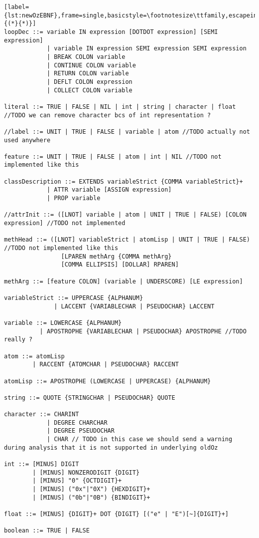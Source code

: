\begin{lstlisting}[label={lst:newOzEBNF},frame=single,basicstyle=\footnotesize\ttfamily,escapeinside={(*}{*)}]
loopDec ::= variable IN expression [DOTDOT expression] [SEMI expression]
            | variable IN expression SEMI expression SEMI expression
            | BREAK COLON variable
            | CONTINUE COLON variable
            | RETURN COLON variable
            | DEFLT COLON expression
            | COLLECT COLON variable

literal ::= TRUE | FALSE | NIL | int | string | character | float //TODO we can remove character bcs of int representation ?

//label ::= UNIT | TRUE | FALSE | variable | atom //TODO actually not used anywhere

feature ::= UNIT | TRUE | FALSE | atom | int | NIL //TODO not implemented like this

classDescription ::= EXTENDS variableStrict {COMMA variableStrict}+
            | ATTR variable [ASSIGN expression]
            | PROP variable

//attrInit ::= ([LNOT] variable | atom | UNIT | TRUE | FALSE) [COLON expression] //TODO not implemented

methHead ::= ([LNOT] variableStrict | atomLisp | UNIT | TRUE | FALSE) //TODO not implemented like this
                [LPAREN methArg {COMMA methArg}
                [COMMA ELLIPSIS] [DOLLAR] RPAREN]

methArg ::= [feature COLON] (variable | UNDERSCORE) [LE expression]

variableStrict ::= UPPERCASE {ALPHANUM}
              | LACCENT {VARIABLECHAR | PSEUDOCHAR} LACCENT

variable ::= LOWERCASE {ALPHANUM}
          | APOSTROPHE {VARIABLECHAR | PSEUDOCHAR} APOSTROPHE //TODO really ?

atom ::= atomLisp
        | RACCENT {ATOMCHAR | PSEUDOCHAR} RACCENT

atomLisp ::= APOSTROPHE (LOWERCASE | UPPERCASE) {ALPHANUM}

string ::= QUOTE {STRINGCHAR | PSEUDOCHAR} QUOTE

character ::= CHARINT
            | DEGREE CHARCHAR
            | DEGREE PSEUDOCHAR
            | CHAR // TODO in this case we should send a warning during analysis that it is not supported in underlying oldOz

int ::= [MINUS] DIGIT
        | [MINUS] NONZERODIGIT {DIGIT}
        | [MINUS] "0" {OCTDIGIT}+
        | [MINUS] ("0x"|"0X") {HEXDIGIT}+
        | [MINUS] ("0b"|"0B") {BINDIGIT}+

float ::= [MINUS] {DIGIT}+ DOT {DIGIT} [("e" | "E")[~]{DIGIT}+]

boolean ::= TRUE | FALSE

\end{lstlisting}
